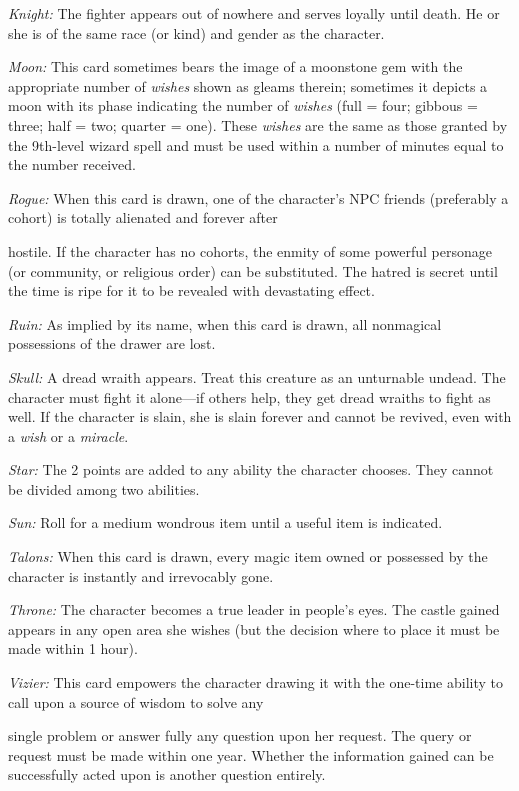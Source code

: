\documentclass{article}
\begin{document}
\textit{Knight: }The fighter appears out of nowhere and serves loyally until death. 
He or she is of the same race (or kind) and gender as the character.

\textit{Moon: }This card sometimes bears the image of a moonstone gem with the 
appropriate number of \textit{wishes }shown as gleams therein; sometimes it depicts 
a moon with its phase indicating the number of \textit{wishes }(full = four; gibbous 
= three; half = two; quarter = one). These \textit{wishes }are the same as those 
granted by the 9th-level wizard spell and must be used within a number of minutes 
equal to the number received.

\textit{Rogue: }When this card is drawn, one of the character's NPC friends (preferably 
a cohort) is totally alienated and forever after

hostile. If the character has no cohorts, the enmity of some powerful personage 
(or community, or religious order) can be substituted. The hatred is secret until 
the time is ripe for it to be revealed with devastating effect.

\textit{Ruin: }As implied by its name, when this card is drawn, all nonmagical 
possessions of the drawer are lost.

\textit{Skull: }A dread wraith appears. Treat this creature as an unturnable undead. 
The character must fight it alone---if others help, they get dread wraiths to fight 
as well. If the character is slain, she is slain forever and cannot be revived, 
even with a \textit{wish }or a \textit{miracle}.

\textit{Star: }The 2 points are added to any ability the character chooses. They 
cannot be divided among two abilities. 

\textit{Sun: }Roll for a medium wondrous item until a useful item is indicated.

\textit{Talons: }When this card is drawn, every magic item owned or possessed by 
the character is instantly and irrevocably gone.

\textit{Throne: }The character becomes a true leader in people's eyes. The castle 
gained appears in any open area she wishes (but the decision where to place it 
must be made within 1 hour).

\textit{Vizier: }This card empowers the character drawing it with the one-time 
ability to call upon a source of wisdom to solve any

single problem or answer fully any question upon her request. The query or request 
must be made within one year. Whether the information gained can be successfully 
acted upon is another question entirely.
\end{document}
